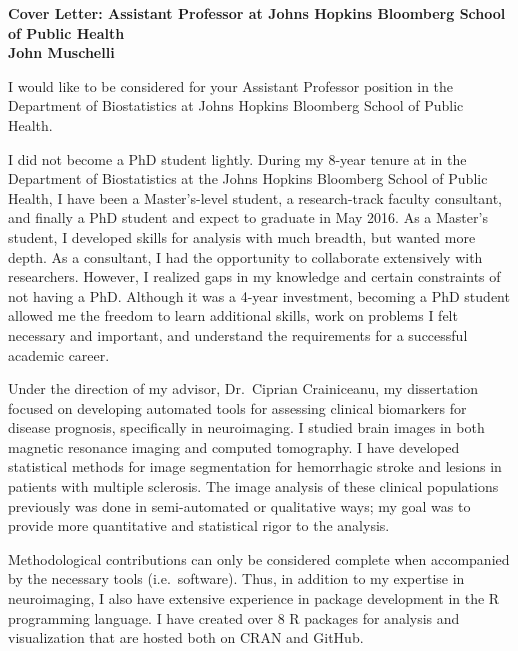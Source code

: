 \documentclass[12pt,a4paper]{article}
\author{John Muschelli}
\begin{document}
\thispagestyle{empty}


\newcommand{\salutation}{ }
\newcommand{\department}{Department of Biostatistics}
\newcommand{\institution}{Johns Hopkins Bloomberg School of Public Health}
\newcommand{\specificending}{}
\newcommand{\position}{Assistant Professor}

\begin{center}
{\bf
{\large Cover Letter: \position{ }at \institution}\\
John Muschelli
}
\end{center}


\salutation
\vspace{2em}


I would like to be considered for your \position{ }position in the \department{ }at \institution.  

I did not become a PhD student lightly.  During my 8-year tenure at in the Department of Biostatistics at the Johns Hopkins Bloomberg School of Public Health, I have been a Master's-level student, a research-track faculty consultant, and finally a PhD student and expect to graduate in May 2016.  As a Master's student, I developed skills for analysis with much breadth, but wanted more depth.  As a consultant, I had the opportunity to collaborate extensively with researchers.  However, I realized gaps in my knowledge and certain constraints of not having a PhD.  Although it was a 4-year investment, becoming a PhD student allowed me the freedom to learn additional skills, work on problems I felt necessary and important, and understand the requirements for a successful academic career. 

Under the direction of my advisor, Dr.~Ciprian Crainiceanu, my dissertation focused on developing automated tools for assessing clinical biomarkers for disease prognosis, specifically in neuroimaging. I studied brain images in both magnetic resonance imaging and computed tomography.  I have developed statistical methods for image segmentation for hemorrhagic stroke and lesions in patients with multiple sclerosis.  The image analysis of these clinical populations previously was done in semi-automated or qualitative ways; my goal was to provide more quantitative and statistical rigor to the analysis.  

Methodological contributions can only be considered complete when accompanied by the necessary tools (i.e.~software).  Thus, in addition to my expertise in neuroimaging, I also have extensive experience in package development in the R programming language.  I have created over 8 R packages for analysis and visualization that are hosted both on CRAN and GitHub.  
\end{document}
